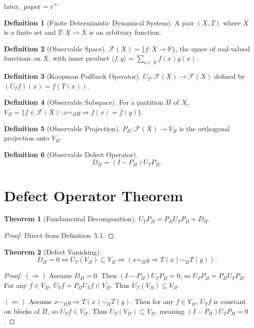latex_paper = r'''\documentclass[11pt,a4paper]{article}
\theoremstyle{definition}
\newtheorem{definition}{Definition}[section]
\newtheorem{theorem}{Theorem}[section]
\begin{document}
\begin{definition}[Finite Deterministic Dynamical System]
A pair $(X, T)$ where $X$ is a finite set and $T: X \to X$ is an arbitrary function.
\end{definition}

\begin{definition}[Observable Space]
$\mathcal{F}(X) = \{f: X \to \mathbb{R}\}$, the space of real-valued functions on $X$, with inner product $\langle f, g \rangle = \sum_{x \in X} f(x)g(x)$.
\end{definition}

\begin{definition}[Koopman Pullback Operator]
$U_T: \mathcal{F}(X) \to \mathcal{F}(X)$ defined by $(U_T f)(x) = f(T(x))$.
\end{definition}

\begin{definition}[Observable Subspace]
For a partition $\Pi$ of $X$, $V_\Pi = \{f \in \mathcal{F}(X) : x \sim_\Pi y \Rightarrow f(x) = f(y)\}$.
\end{definition}

\begin{definition}[Observable Projection]
$P_\Pi: \mathcal{F}(X) \to V_\Pi$ is the orthogonal projection onto $V_\Pi$.
\end{definition}

\begin{definition}[Observable Defect Operator]
\[
D_\Pi = (I - P_\Pi) U_T P_\Pi.
\]
\end{definition}

\section{Defect Operator Theorem}

\begin{theorem}[Fundamental Decomposition]
$U_T P_\Pi = P_\Pi U_T P_\Pi + D_\Pi$.
\end{theorem}

\begin{proof}
Direct from Definition~5.1.
\end{proof}

\begin{theorem}[Defect Vanishing]
\[
D_\Pi = 0 \iff U_T(V_\Pi) \subseteq V_\Pi \iff (x \sim_\Pi y \Rightarrow T(x) \sim_\Pi T(y)).
\]
\end{theorem}

\begin{proof}
$(\Rightarrow)$ Assume $D_\Pi = 0$. Then $(I - P_\Pi) U_T P_\Pi = 0$, so $U_T P_\Pi = P_\Pi U_T P_\Pi$. For any $f \in V_\Pi$, $U_T f = P_\Pi U_T f \in V_\Pi$. Thus $U_T(V_\Pi) \subseteq V_\Pi$.

$(\Leftarrow)$ Assume $x \sim_\Pi y \Rightarrow T(x) \sim_\Pi T(y)$. Then for any $f \in V_\Pi$, $U_T f$ is constant on blocks of $\Pi$, so $U_T f \in V_\Pi$. Thus $U_T(V_\Pi) \subseteq V_\Pi$, meaning $(I - P_\Pi) U_T P_\Pi = 0$.
\end{proof}
\end{document}
